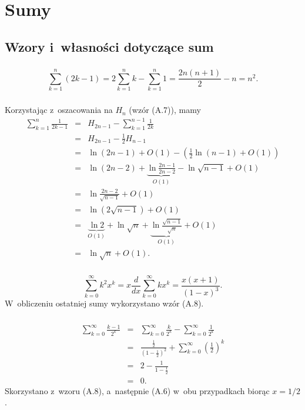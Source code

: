 \chapter{Sumy}

\section{Wzory i~własności dotyczące sum}

\subsection{} %
\[
	\sum_{k=1}^n(2k-1) = 2\sum_{k=1}^nk-\sum_{k=1}^n1 = \frac{2n(n+1)}{2}-n = n^2.
\]

\subsection{} %
Korzystając z~oszacowania na $H_n$ (wzór (A.7)), mamy
\begin{eqnarray*}
	\sum_{k=1}^n\frac{1}{2k-1} &=& H_{2n-1}-\sum_{k=1}^{n-1}\frac{1}{2k} \\
	&=& H_{2n-1}-\frac{1}{2}H_{n-1} \\
	&=& \ln (2n-1)+O(1)-\left(\frac{1}{2}\ln(n-1)+O(1)\right) \\
	&=& \ln (2n-2)+\underbrace{\ln\frac{2n-1}{2n-2}}_{O(1)}-\ln\sqrt{n-1}+O(1) \\
	&=& \ln\frac{2n-2}{\sqrt{n-1}}+O(1) \\
	&=& \ln\left(2\sqrt{n-1}\right)+O(1) \\
	&=& \underbrace{\ln 2}_{O(1)}+\ln\sqrt{n}+\underbrace{\ln\frac{\sqrt{n-1}}{\sqrt{n}}}_{O(1)}+O(1) \\
	&=& \ln\sqrt{n}+O(1).
\end{eqnarray*}

\subsection{} %
\[
	\sum_{k=0}^\infty k^2x^k = x\frac{d}{dx}\sum_{k=0}^\infty kx^k = \frac{x(x+1)}{(1-x)^3}.
\]
W~obliczeniu ostatniej sumy wykorzystano wzór (A.8).

\subsection{} %
\begin{eqnarray*}
	\sum_{k=0}^\infty\frac{k-1}{2^k} &=& \sum_{k=0}^\infty\frac{k}{2^k}-\sum_{k=0}^\infty\frac{1}{2^k} \\
	&=& \frac{\frac{1}{2}}{\left(1-\frac{1}{2}\right)^2}+\sum_{k=0}^\infty\left(\frac{1}{2}\right)^k \\
	&=& 2-\frac{1}{1-\frac{1}{2}} \\
	&=& 0.
\end{eqnarray*}
Skorzystano z~wzoru (A.8), a~następnie (A.6) w~obu przypadkach biorąc $x=1/2$.

